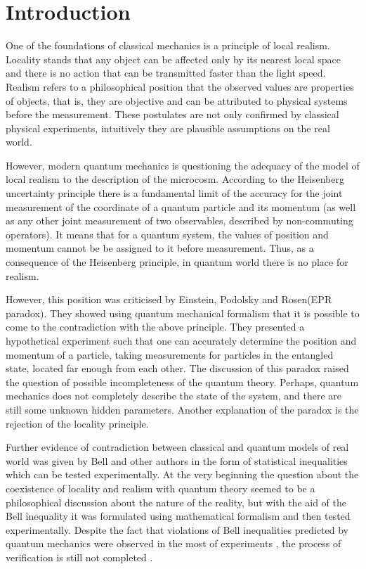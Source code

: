 \documentclass[%
master,         %
subf,           %
href,           %
colorlinks=true %
]{disser}
\numberwithin{equation}{section}
\numberwithin{figure}{section}
\begin{document}
\tableofcontents

\section{Introduction}
One of the foundations of classical mechanics is a principle of local realism. Locality stands that any object can be affected only by its nearest local space and there is no action that can be transmitted faster than the light speed. Realism refers to a philosophical position that the observed values are properties of objects, that is, they are objective and can be attributed to physical systems before the measurement. These postulates are not only confirmed by classical physical experiments, intuitively they are plausible assumptions on the real world.

However, modern quantum mechanics is questioning the adequacy of the model of local realism to the description of the microcosm. According to the Heisenberg uncertainty principle there is a fundamental limit of the accuracy for the joint measurement of the coordinate of a quantum particle and its momentum (as well as any other joint measurement of two observables, described by non-commuting operators). It means that for a quantum system, the values of position and momentum cannot be be assigned to it before measurement. Thus, as a consequence of the Heisenberg principle, in quantum world there is no place for realism.

However, this position was criticised by Einstein, Podolsky and Rosen(EPR paradox)\cite{EPR}. They showed using quantum mechanical formalism that it is possible to come to the contradiction with the above principle. They presented a hypothetical experiment such that one can accurately determine the position and momentum of a particle, taking measurements for particles in the entangled state, located far enough from each other. The discussion of this paradox raised the question of possible incompleteness of the quantum theory. Perhaps, quantum mechanics does not completely describe the state of the system, and there are still some unknown hidden parameters. Another explanation of the paradox is the rejection of the locality principle.

Further evidence of contradiction between classical and quantum models of real world was given by Bell and other authors in the form of statistical inequalities which can be tested experimentally. At the very beginning the question about the coexistence of locality and realism with quantum theory seemed to be a philosophical discussion about the nature of the reality, but with the aid of the Bell inequality it was formulated using mathematical formalism and then tested experimentally. Despite the fact that violations of Bell inequalities predicted by quantum mechanics were observed in the most of experiments \cite{ASP1}, the process of verification is still not completed \cite{Khrennikov_preprint}.
\end{document}

